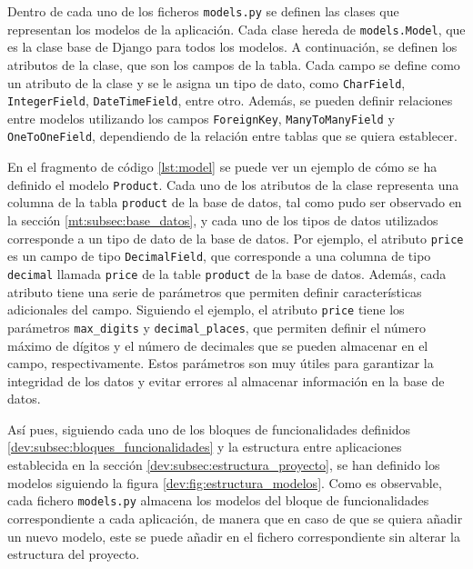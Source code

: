 Dentro de cada uno de los ficheros \texttt{models.py} se definen las clases que representan los modelos de la aplicación. Cada clase hereda de \texttt{models.Model}, que es la clase base de Django para todos los modelos. A continuación, se definen los atributos de la clase, que son los campos de la tabla. Cada campo se define como un atributo de la clase y se le asigna un tipo de dato, como \texttt{CharField}, \texttt{IntegerField}, \texttt{DateTimeField}, entre otro. Además, se pueden definir relaciones entre modelos utilizando los campos \texttt{ForeignKey}, \texttt{ManyToManyField} y \texttt{OneToOneField}, dependiendo de la relación entre tablas que se quiera establecer.

\begin{center}
    \begin{minipage}{0.8\textwidth}
        
    \end{minipage}
\end{center}

En el fragmento de código \ref{lst:model} se puede ver un ejemplo de cómo se ha definido el modelo \texttt{Product}. Cada uno de los atributos de la clase representa una columna de la tabla \texttt{product} de la base de datos, tal como pudo ser observado en la sección \ref{mt:subsec:base_datos}, y cada uno de los tipos de datos utilizados corresponde a un tipo de dato de la base de datos. Por ejemplo, el atributo \texttt{price} es un campo de tipo \texttt{DecimalField}, que corresponde a una columna de tipo \texttt{decimal} llamada \texttt{price} de la table \texttt{product} de la base de datos. Además, cada atributo tiene una serie de parámetros que permiten definir características adicionales del campo. Siguiendo el ejemplo, el atributo \texttt{price} tiene los parámetros \texttt{max\_digits} y \texttt{decimal\_places}, que permiten definir el número máximo de dígitos y el número de decimales que se pueden almacenar en el campo, respectivamente. Estos parámetros son muy útiles para garantizar la integridad de los datos y evitar errores al almacenar información en la base de datos.

Así pues, siguiendo cada uno de los bloques de funcionalidades definidos \ref{dev:subsec:bloques_funcionalidades} y la estructura entre aplicaciones establecida en la sección \ref{dev:subsec:estructura_proyecto}, se han definido los modelos siguiendo la figura \ref{dev:fig:estructura_modelos}. Como es observable, cada fichero \texttt{models.py} almacena los modelos del bloque de funcionalidades correspondiente a cada aplicación, de manera que en caso de que se quiera añadir un nuevo modelo, este se puede añadir en el fichero correspondiente sin alterar la estructura del proyecto.

